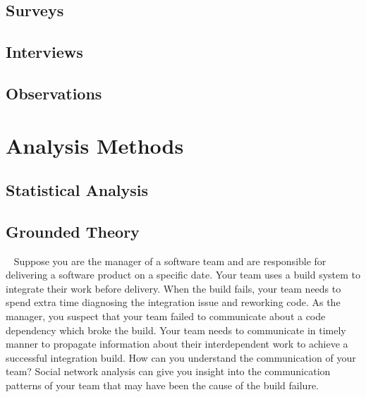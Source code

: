 \subsection{Surveys}
\subsection{Interviews}
\subsection{Observations}

\section{Analysis Methods}
\subsection{Statistical Analysis}
\subsection{Grounded Theory}

\newpage\ \newpage
Suppose you are the manager of a software team and are responsible for delivering
a software product on a specific date. Your team uses a build system to integrate
their work before delivery. When the build fails, your team needs to spend extra
time diagnosing the integration issue and reworking code. As the manager, you
suspect that your team failed to communicate about a code dependency which broke
the build. Your team needs to communicate in timely manner to propagate
information about their interdependent work to achieve a successful integration
build. How can you understand the communication of your team? Social network
analysis can give you insight into the communication patterns of your team that
may have been the cause of the build failure.


